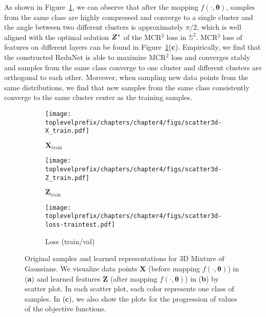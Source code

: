 \documentclass[\toplevelprefix/book-main.tex]{subfiles}
\begin{document}
\begin{example}
As shown in Figure~\ref{fig:redu-3d-gaussian-diagram}, we can observe that after the mapping $f(\cdot, \bm{\theta})$, samples from the same class are highly compressed and converge to a single cluster and the angle between two different clusters is approximately $\pi/2$, which is well aligned with the optimal solution $\bm{Z}^{\star}$ of the MCR$^2$ loss in $\mathbb{S}^2$. 
MCR$^2$ loss of features on different layers can be found in Figure~\ref{fig:redu-3d-gaussian-diagram}(\textbf{c}). Empirically, we find that the constructed ReduNet is able to maximize MCR$^2$ loss and converges stably and samples from the same class converge to one cluster and different clusters are orthogonal to each other. 
Moreover, when sampling new data points from the same distributions, we find that new samples from the same class consistently converge to the same cluster center as the training samples. 
\begin{figure}[t]
    \begin{subfigure}[t]{0.32\textwidth}
        \centering 
        \texttt{[image: \\toplevelprefix/chapters/chapter4/figs/scatter3d-X\_train.pdf]}\vspace{-0.1in}
        \caption{$\bm{X}_{\text{train}}$}
    \end{subfigure}
    \hfill
    \begin{subfigure}[t]{0.32\textwidth}
        \centering 
        \texttt{[image: \\toplevelprefix/chapters/chapter4/figs/scatter3d-Z\_train.pdf]}\vspace{-0.1in}
        \caption{$\bm{Z}_{\text{train}}$}
    \end{subfigure}
    \hfill
    \begin{subfigure}[t]{0.32\textwidth}
        \centering 
        \texttt{[image: \\toplevelprefix/chapters/chapter4/figs/scatter3d-loss-traintest.pdf]}\vspace{-0.1in}
        \caption{Loss (train/val)}
    \end{subfigure}
    \vspace{-0.1in}
    \caption{\small Original samples  and learned representations for 3D Mixture of Gaussians. We visualize data points $\bm{X}$ (before mapping $f(\cdot, \bm{\theta})$) in (\textbf{a}) and learned features $\bm{Z}$ (after mapping $f(\cdot, \bm{\theta})$) in (\textbf{b}) by scatter plot. In each scatter plot, each color represents one class of samples. In (\textbf{c}), we also show the plots for the progression of values of the objective functions.}
    \label{fig:redu-3d-gaussian-diagram}
\end{figure}

\end{example}
\end{document}
